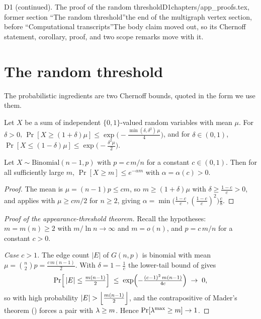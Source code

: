 \begin{offcut}{D1 (continued). The proof of the random threshold}{D1}{chapters/app\_proofs.tex, former section ``The random threshold''}{the end of the multigraph vertex section, before ``Computational transcripts''}{The body claim moved out, so its Chernoff statement, corollary, proof, and two scope remarks move with it.}
\section{The random threshold}

The probabilistic ingredients are two Chernoff bounds, quoted in the form we use them.

\begin{theorem}\label{thm:chernoff}
Let $X$ be a sum of independent $\{0,1\}$-valued random variables with mean $\mu$. For $\delta > 0$, $\Pr[X \ge (1+\delta)\mu] \le \exp\bigl(-\tfrac{\min(\delta, \delta^2)\,\mu}{4}\bigr)$, and for $\delta \in (0,1)$, $\Pr[X \le (1-\delta)\mu] \le \exp\bigl(-\tfrac{\delta^2 \mu}{2}\bigr)$.
\end{theorem}

\begin{corollary}\label{cor:chernoff-degree}
Let $X \sim \mathrm{Binomial}(n-1, p)$ with $p = c\,m/n$ for a constant $c \in (0,1)$. Then for all sufficiently large $m$, $\Pr[X \ge m] \le e^{-\alpha m}$ with $\alpha = \alpha(c) > 0$.
\end{corollary}

\begin{proof}
The mean is $\mu = (n-1)p \le cm$, so $m \ge (1+\delta)\mu$ with $\delta \ge \frac{1-c}{c} > 0$, and  applies with $\mu \ge cm/2$ for $n \ge 2$, giving $\alpha = \min\bigl(\tfrac{1-c}{c}, (\tfrac{1-c}{c})^2\bigr)\tfrac{c}{8}$.
\end{proof}

\begin{proof}[Proof of the appearance-threshold theorem]
Recall the hypotheses: $m = m(n) \ge 2$ with $m / \ln n \to \infty$ and $m = o(n)$, and $p = c\,m/n$ for a constant $c > 0$.

\emph{Case $c > 1$.} The edge count $|E|$ of $G(n,p)$ is binomial with mean $\mu = \binom{n}{2} p = \tfrac{c\,m(n-1)}{2}$. With $\delta = 1 - \tfrac1c$ the lower-tail bound of  gives
\[
\Pr\Bigl[\,|E| \le \tfrac{m(n-1)}{2}\Bigr] \;\le\; \exp\Bigl(-\tfrac{(c-1)^2\,m(n-1)}{4c}\Bigr) \;\to\; 0,
\]
so with high probability $|E| > \left\lfloor \frac{m(n-1)}{2} \right\rfloor$, and the contrapositive of Mader's theorem () forces a pair with $\lambda \ge m$. Hence $\Pr[\lambda^{\max} \ge m] \to 1$.


\end{proof}
\end{offcut}
